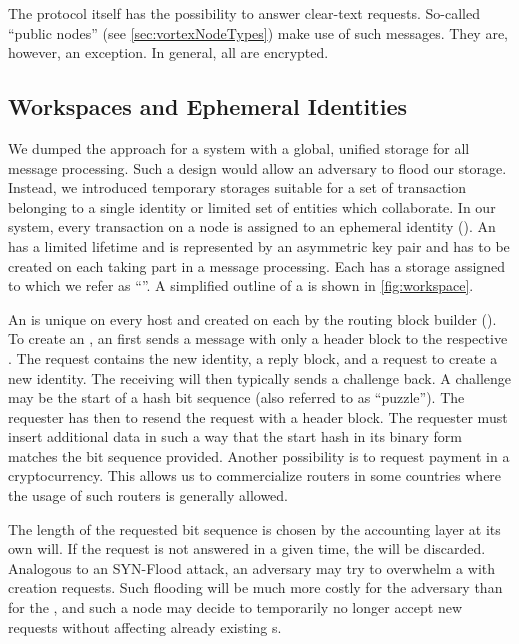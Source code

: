 The protocol itself has the possibility to answer clear-text requests. So-called ``public nodes'' (see \cref{sec:vortexNodeTypes}) make use of such messages. They are, however, an exception. In general, all \VortexMessages{} are encrypted. 

\subsection{Workspaces and Ephemeral Identities}
We dumped the approach for a system with a global, unified storage for all message processing. Such a design would allow an adversary to flood our storage. Instead, we introduced temporary storages suitable for a set of transaction belonging to a single identity or limited set of entities which collaborate. In our system, every transaction on a node is assigned to an ephemeral identity (). An  has a limited lifetime and is represented by an asymmetric key pair and has to be created on each \VortexNode{} taking part in a message processing. Each  has a storage assigned to which we refer as ``''. A simplified outline of a  is shown in \cref{fig:workspace}.

An  is unique on every host and created on each \VortexNode{} by the routing block builder (). To create an , an  first sends a message with only a header block to the respective \VortexNode. The request contains the new identity, a reply block, and a request to create a new identity. The receiving \VortexNode{} will then typically sends a challenge back. A challenge may be the start of a hash bit sequence (also referred to as ``puzzle''). The requester has then to resend the request with a header block. The requester must insert additional data in such a way that the start hash in its binary form matches the bit sequence provided. Another possibility is to request payment in a cryptocurrency. This allows us to commercialize routers in some countries where the usage of such routers is generally allowed.

The length of the requested bit sequence is chosen by the accounting layer at its own will. If the request is not answered in a given time, the  will be discarded. Analogous to an SYN-Flood attack, an adversary may try to overwhelm a \VortexNode{} with  creation requests. Such flooding will be much more costly for the adversary than for the \VortexNode{}, and such a node may decide to temporarily no longer accept new  requests without affecting already existing s.

